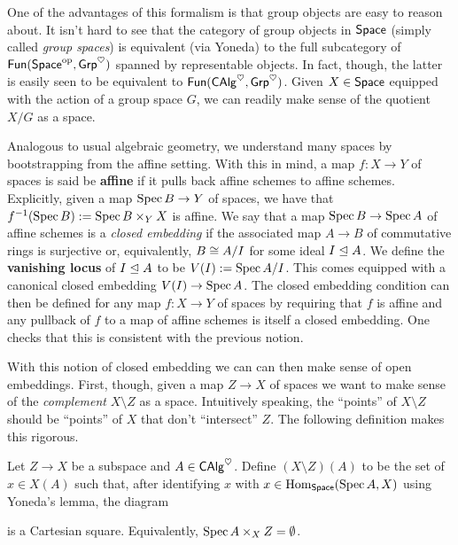 \documentclass[11pt]{article}
\begin{document}
\begin{remark}
One of the advantages of this formalism is that group objects are easy to reason about. It isn't hard to see that the category of group objects in $\operatorname{\mathsf{Space}}$ (simply called \emph{group spaces}) is equivalent (via Yoneda) to the full subcategory of $\operatorname{\mathsf{Fun}}(\operatorname{\mathsf{Space}}^{\operatorname{op}},\operatorname{\mathsf{Grp}}^{\heartsuit})$ spanned by representable objects. In fact, though, the latter is easily seen to be equivalent to $\operatorname{\mathsf{Fun}}(\operatorname{\mathsf{CAlg}}^{\heartsuit},\operatorname{\mathsf{Grp}}^{\heartsuit})$. Given $X\in\operatorname{\mathsf{Space}}$ equipped with the action of a group space $G$, we can readily make sense of the quotient $X/G$ as a space.
\end{remark}

Analogous to usual algebraic geometry, we understand many spaces by bootstrapping from the affine setting. With this in mind, a map $f: X\to Y$ of spaces is said be \textbf{affine} if it pulls back affine schemes to affine schemes. Explicitly, given a map $\operatorname{Spec} B\to Y$ of spaces, we have that $f^{-1}(\operatorname{Spec} B):=\operatorname{Spec} B\times_YX$ is affine. We say that a map $\operatorname{Spec} B\to\operatorname{Spec} A$ of affine schemes is a \emph{closed embedding} if the associated map $A\to B$ of commutative rings is surjective or, equivalently, $B\cong A/I$ for some ideal $I\trianglelefteq A$. We define the \textbf{vanishing locus} of $I\trianglelefteq A$ to be $V(I):=\operatorname{Spec} A/I$. This comes equipped with a canonical closed embedding $V(I)\to\operatorname{Spec} A$. The closed embedding condition can then be defined for any map $f: X\to Y$ of spaces by requiring that $f$ is affine and any pullback of $f$ to a map of affine schemes is itself a closed embedding. One checks that this is consistent with the previous notion.

With this notion of closed embedding we can can then make sense of open embeddings. First, though, given a map $Z\to X$ of spaces we want to make sense of the \emph{complement} $X\setminus Z$ as a space. Intuitively speaking, the ``points'' of $X\setminus Z$ should be ``points'' of $X$ that don't ``intersect'' $Z$. The following definition makes this rigorous.

\begin{definition}
Let $Z\to X$ be a subspace and $A\in\operatorname{\mathsf{CAlg}}^{\heartsuit}$. Define $(X\setminus Z)(A)$ to be the set of $x\in X(A)$ such that, after identifying $x$ with $x\in\operatorname{Hom}_{\operatorname{\mathsf{Space}}}(\operatorname{Spec} A,X)$ using Yoneda's lemma, the diagram
\begin{center}
\end{center}
is a Cartesian square. Equivalently, $\operatorname{Spec} A\times_XZ=\emptyset$.
\end{definition}
\end{document}
